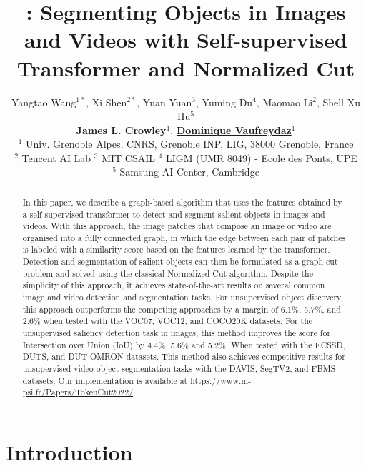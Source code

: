 \documentclass[twocolumn]{article}
\title{\name: Segmenting Objects in Images and Videos with Self-supervised Transformer and Normalized Cut}
\author{Yangtao Wang$^{1*}$, Xi Shen$^{2*}$, Yuan Yuan$^3$,  Yuming Du$^4$,  Maomao Li$^2$, Shell Xu Hu$^5$ \\ \textbf{James L. Crowley}$^1$, \textbf{\href{https://research.vaufreydaz.org/}{\color{black}Dominique Vaufreydaz}}$^1$ \\
$^1$ Univ. Grenoble Alpes, CNRS, Grenoble INP, LIG, 38000 Grenoble, France\\
$^2$ Tencent AI Lab \hspace{5mm}
$^3$ MIT CSAIL 
$^4$ LIGM (UMR 8049) - Ecole des Ponts, UPE \\
$^5$ Samsung AI Center, Cambridge \hspace{5mm}
}
\begin{document}
\twocolumn[{\begin{@twocolumnfalse}
    \maketitle
  \end{@twocolumnfalse}
}]


\setcounter{footnote}{0}
\renewcommand{\thefootnote}{*}

\begin{abstract}
In this paper, we describe a graph-based algorithm that uses the
features obtained by a self-supervised transformer to detect and segment salient objects in images and videos. 
With this approach, the image patches that compose an image or video are organised into a fully connected graph, in which the edge between each pair of patches is labeled with a similarity score based on the features learned by the transformer. Detection and segmentation of salient objects can then be formulated as a graph-cut problem and solved using the classical Normalized Cut algorithm. Despite the simplicity of this approach, it achieves state-of-the-art results on several common image and video detection and segmentation tasks. For unsupervised object discovery, this approach outperforms the competing approaches by a margin of 6.1\%, 5.7\%, and 2.6\% when tested with the VOC07, VOC12, and COCO20K datasets. For the unsupervised saliency detection task in images, this method improves the score for Intersection over Union (IoU) by 4.4\%, 5.6\% and 5.2\%. When tested with the ECSSD, DUTS, and DUT-OMRON datasets. This method also achieves competitive results for unsupervised video object segmentation tasks with the DAVIS, SegTV2, and FBMS datasets. Our implementation is available at  \href{https://www.m-psi.fr/Papers/TokenCut2022/}{https://www.m-psi.fr/Papers/TokenCut2022/}.

\end{abstract}

\section{Introduction}
\end{document}
